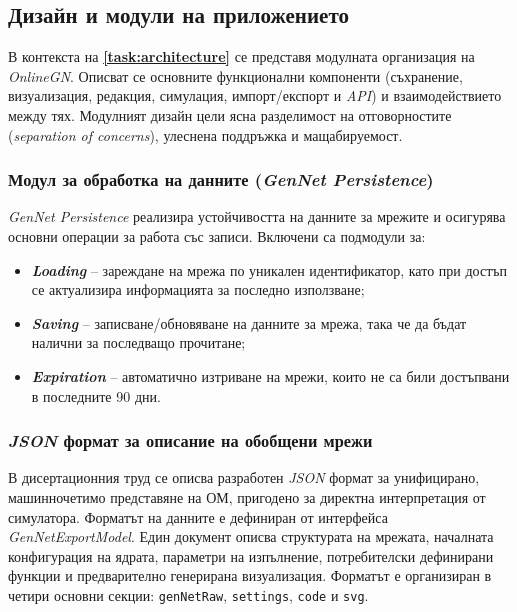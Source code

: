 \subsection{Дизайн и модули на приложението}
\hspace*{2.5em}В контекста на \textbf{\ref{task:architecture}} се представя модулната организация на \textit{OnlineGN}. Описват се основните функционални компоненти (съхранение, визуализация, редакция, симулация, импорт/експорт и \textit{API}) и взаимодействието между тях. Модулният дизайн цели ясна разделимост на отговорностите (\textit{separation of concerns}), улеснена поддръжка и мащабируемост.

\subsubsection{Модул за обработка на данните (\textit{GenNet Persistence})}
\hspace*{2.5em}\textit{GenNet Persistence} реализира устойчивостта на данните за мрежите и осигурява основни операции за работа със записи. Включени са подмодули за:
\begin{itemize}
    \item \textbf{\textit{Loading}} -- зареждане на мрежа по уникален идентификатор, като при достъп се актуализира информацията за последно използване;
    \item \textbf{\textit{Saving}} -- записване/обновяване на данните за мрежа, така че да бъдат налични за последващо прочитане;
    \item \textbf{\textit{Expiration}} -- автоматично изтриване на мрежи, които не са били достъпвани в последните 90 дни.
\end{itemize}

\subsubsection{\textit{JSON} формат за описание на обобщени мрежи}
\label{subsec:gn-json-format}

\hspace*{2.5em}В дисертационния труд се описва разработен \textit{JSON} формат за унифицирано, машинночетимо представяне на ОМ, пригодено за директна интерпретация от симулатора. Форматът на данните е дефиниран от интерфейса \textit{GenNetExportModel}. Един документ описва структурата на мрежата, началната конфигурация на ядрата, параметри на изпълнение, потребителски дефинирани функции и предварително генерирана визуализация. Форматът е организиран в четири основни секции: \texttt{genNetRaw}, \texttt{settings}, \texttt{code} и \texttt{svg}.

